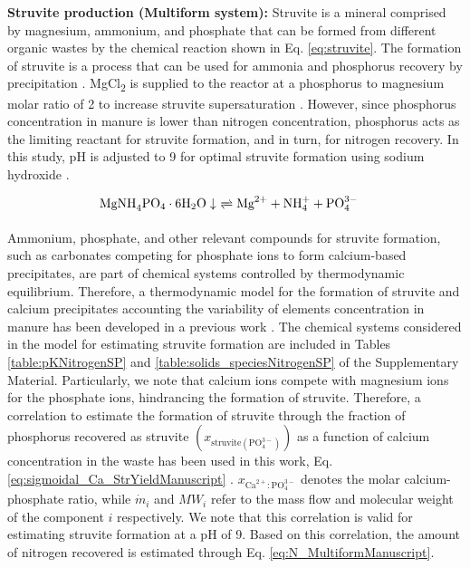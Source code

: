 \begin{refsection}[referencesCh6]
\textbf{Struvite production (Multiform system):} Struvite is a mineral comprised by magnesium, ammonium, and phosphate that can be formed from different  organic wastes by the chemical reaction shown in Eq. \ref{eq:struvite}. The formation of struvite is a process that can be used for ammonia and phosphorus recovery by precipitation \citep{martin2020m}. MgCl\textsubscript{2} is supplied to the reactor at a phosphorus to magnesium molar ratio of 2 to increase struvite supersaturation \citep{bhuiyan2008phosphorus}. However, since phosphorus concentration in manure is lower than nitrogen concentration, phosphorus acts as the limiting reactant for struvite formation, and in turn, for nitrogen recovery. In this study, pH is adjusted to 9 for optimal struvite formation using sodium hydroxide \citep{Tao}.

\begin{align}
	& \text{MgNH}_{4}\text{PO}_{4} \cdot 6\text{H}_{2}\text{O} \downarrow \ \xrightleftharpoons[]{} \text{Mg}^{2+} + \text{NH}_{4}^{+} + \text{PO}_{4}^{3-} \label{eq:struvite}
\end{align}

Ammonium, phosphate, and other relevant compounds for struvite formation, such as carbonates competing for phosphate ions to form calcium-based precipitates, are part of chemical systems controlled by thermodynamic equilibrium. Therefore, a thermodynamic model for the formation of struvite and calcium precipitates accounting the variability of elements concentration in manure has been developed in a previous work \citep{martin2020m}.
The chemical systems considered in the model for estimating struvite formation are included
in Tables \ref{table:pKNitrogenSP} and \ref{table:solids_speciesNitrogenSP} of the Supplementary Material.
Particularly, we note that calcium ions compete with magnesium ions for the phosphate ions, hindrancing the formation of struvite. Therefore, a correlation
to estimate the formation of struvite through the fraction of phosphorus recovered as struvite $\left(x_{\text{struvite} \left(\text{PO}_{4}^{3-}\right) }\right) $ as a function of calcium concentration in the waste has been used in this work, Eq. \ref{eq:sigmoidal_Ca_StrYieldManuscript} \citep{martin2020m}. $x_{\text{Ca}^{2+}:\text{PO}_{4}^{3-}}$ denotes the molar calcium-phosphate ratio, while $\dot{m}_{i}$ and $MW_i$ refer to the mass flow and molecular weight of the component $i$ respectively. We note that this correlation is valid for estimating struvite formation at a pH of 9.
Based on this correlation,
the amount of nitrogen recovered is estimated through Eq. \ref{eq:N_MultiformManuscript}.


\end{refsection}
